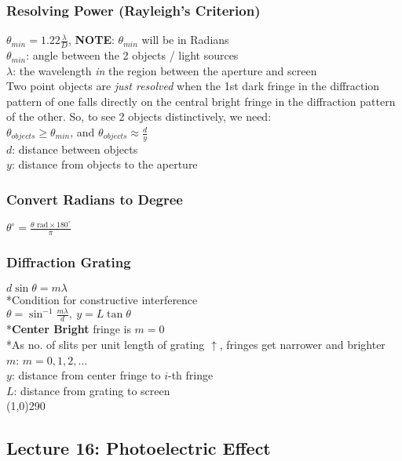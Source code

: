 \documentclass[10 pt]{article}
\begin{document}
\begin{multicols}{2}
\subsubsection*{Resolving Power (Rayleigh's Criterion)}
$\theta_{min} = 1.22 \frac{\lambda}{D}$, \textbf{NOTE}: $\theta_{min}$ will be in Radians \\
$\theta_{min}$: angle between the 2 objects / light sources \\
$\lambda$: the wavelength \textit{in} the region between the aperture and screen \\
Two point objects are \textit{just resolved} when the 1st dark fringe in the diffraction pattern of one falls directly on the central bright fringe in the diffraction pattern of the other. So, to see 2 objects distinctively, we need: \\
$\theta_{objects} \geq \theta_{min}$, and $\theta_{objects} \approx \frac{d}{y}$ \\
$d$: distance between objects \\
$y$: distance from objects to the aperture
\subsubsection*{Convert Radians to Degree}
$\theta^{\circ}=\frac{\theta \text{ rad} \times 180^{\circ}}{\pi}$
\subsubsection*{Diffraction Grating}
$d \sin{\theta} = m\lambda$ \\
*Condition for constructive interference \\
$\theta = \sin^{-1}{\frac{m\lambda}{d}}, ~y = L \tan{\theta}$ \\
*\textbf{Center Bright} fringe is $m=0$ \\
*As no. of slits per unit length of grating $\uparrow$, fringes get narrower and brighter \\
$m$: $m=0,1,2,\ldots$ \\
$y$: distance from center fringe to $i$-th fringe \\
$L$: distance from grating to screen \\
\line(1,0){290}

\subsection*{Lecture 16: Photoelectric Effect}

\end{multicols}
\end{document}
